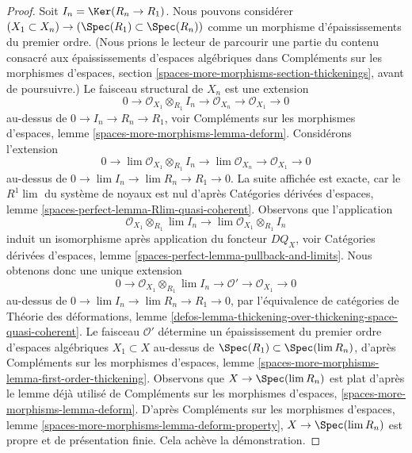\begin{proof}
\medskip\noindent
Soit $I_n = \Ker(R_n \to R_1)$. Nous pouvons considérer
$(X_1 \subset X_n) \to (\Spec(R_1) \subset \Spec(R_n))$
comme un morphisme d'épaississements du premier ordre. (Nous prions le lecteur
de parcourir une partie du contenu consacré aux épaississements d'espaces
algébriques dans Compléments sur les morphismes d'espaces, section
\ref{spaces-more-morphisms-section-thickenings}, avant de poursuivre.)
Le faisceau structural de $X_n$ est une extension
$$
0 \to \mathcal{O}_{X_1} \otimes_{R_1} I_n \to
\mathcal{O}_{X_n} \to \mathcal{O}_{X_1} \to 0
$$
au-dessus de $0 \to I_n \to R_n \to R_1$, voir
Compléments sur les morphismes d'espaces, lemme
\ref{spaces-more-morphisms-lemma-deform}.
Considérons l'extension
$$
0 \to \lim \mathcal{O}_{X_1} \otimes_{R_1} I_n \to
\lim \mathcal{O}_{X_n} \to \mathcal{O}_{X_1} \to 0
$$
au-dessus de $0 \to \lim I_n \to \lim R_n \to R_1 \to 0$.
La suite affichée est exacte, car le $R^1\lim$ du système de noyaux est nul
d'après Catégories dérivées d'espaces, lemme
\ref{spaces-perfect-lemma-Rlim-quasi-coherent}.
Observons que l'application
$$
\mathcal{O}_{X_1} \otimes_{R_1} \lim I_n \longrightarrow
\lim \mathcal{O}_{X_1} \otimes_{R_1} I_n
$$
induit un isomorphisme après application du foncteur $DQ_X$, voir
Catégories dérivées d'espaces, lemme
\ref{spaces-perfect-lemma-pullback-and-limits}.
Nous obtenons donc une unique extension
$$
0 \to \mathcal{O}_{X_1} \otimes_{R_1} \lim I_n \to
\mathcal{O}' \to \mathcal{O}_{X_1} \to 0
$$
au-dessus de $0 \to \lim I_n \to \lim R_n \to R_1 \to 0$,
par l'équivalence de catégories de
Théorie des déformations, lemme
\ref{defos-lemma-thickening-over-thickening-space-quasi-coherent}.
Le faisceau $\mathcal{O}'$ détermine un épaississement du premier ordre
d'espaces algébriques $X_1 \subset X$ au-dessus de
$\Spec(R_1) \subset \Spec(\lim R_n)$, d'après
Compléments sur les morphismes d'espaces, lemme
\ref{spaces-more-morphisms-lemma-first-order-thickening}.
Observons que $X \to \Spec(\lim R_n)$ est plat d'après le lemme déjà utilisé
de Compléments sur les morphismes d'espaces,
\ref{spaces-more-morphisms-lemma-deform}.
D'après Compléments sur les morphismes d'espaces, lemme
\ref{spaces-more-morphisms-lemma-deform-property},
$X \to \Spec(\lim R_n)$ est propre et de présentation finie.
Cela achève la démonstration.
\end{proof}

